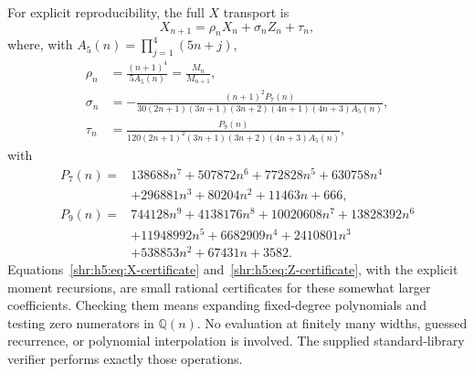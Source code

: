 \documentclass[11pt,letterpaper]{article}
\numberwithin{equation}{section}
\theoremstyle{definition}
\newcommand{\Q}{\mathbb Q}
\newcommand{\1}{\mathbf 1}
\begin{document}
For explicit reproducibility, the full $X$ transport is
\begin{equation}
 X_{n+1}=\rho_nX_n+\sigma_nZ_n+\tau_n,
 \label{shr:h5:eq:X-shift}
\end{equation}
where, with $A_5(n)=\prod_{j=1}^4(5n+j)$,
\begin{align}
 \rho_n&=\frac{(n+1)^4}{5A_5(n)}=\frac{M_n}{M_{n+1}},
 \label{shr:h5:eq:rho}\\
 \sigma_n&=-\frac{(n+1)^2P_7(n)}
 {30(2n+1)(3n+1)(3n+2)(4n+1)(4n+3)A_5(n)},\\
 \tau_n&=\frac{P_9(n)}
 {120(2n+1)^2(3n+1)(3n+2)(4n+3)A_5(n)},
 \label{shr:h5:eq:sigma-tau}
\end{align}
with
\begin{align}
 P_7(n)={}&138688n^7+507872n^6+772828n^5+630758n^4\\
         &+296881n^3+80204n^2+11463n+666,\\
 P_9(n)={}&744128n^9+4138176n^8+10020608n^7+13828392n^6\\
         &+11948992n^5+6682909n^4+2410801n^3\\
         &+538853n^2+67431n+3582.
 \label{shr:h5:eq:P7P9}
\end{align}
Equations~\eqref{shr:h5:eq:X-certificate} and~\eqref{shr:h5:eq:Z-certificate},
with the explicit moment recursions, are small rational certificates for
these somewhat larger coefficients. Checking them means expanding
fixed-degree polynomials and testing zero numerators in $\Q(n)$.
No evaluation at finitely many widths, guessed recurrence, or polynomial
interpolation is involved. The supplied standard-library verifier performs
exactly those operations.
\end{document}
